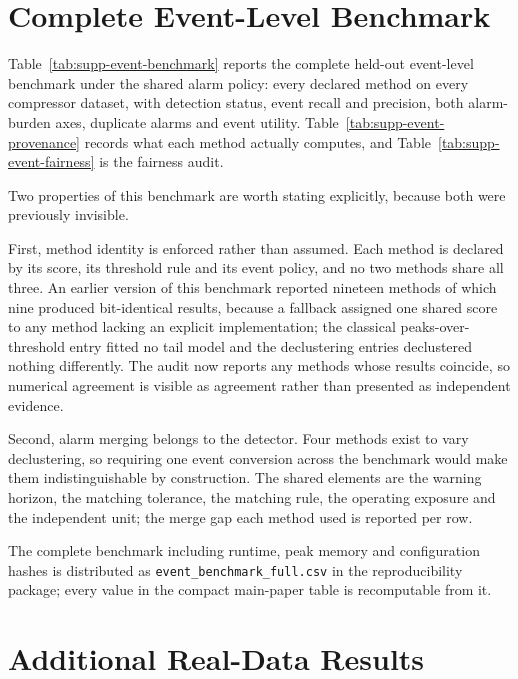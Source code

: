 \section{Complete Event-Level Benchmark}
\label{supp:event-benchmark}

Table~\ref{tab:supp-event-benchmark} reports the complete held-out event-level benchmark under the shared alarm policy: every declared method on every compressor dataset, with detection status, event recall and precision, both alarm-burden axes, duplicate alarms and event utility. Table~\ref{tab:supp-event-provenance} records what each method actually computes, and Table~\ref{tab:supp-event-fairness} is the fairness audit.

Two properties of this benchmark are worth stating explicitly, because both were previously invisible.

First, method identity is enforced rather than assumed. Each method is declared by its score, its threshold rule and its event policy, and no two methods share all three. An earlier version of this benchmark reported nineteen methods of which nine produced bit-identical results, because a fallback assigned one shared score to any method lacking an explicit implementation; the classical peaks-over-threshold entry fitted no tail model and the declustering entries declustered nothing differently. The audit now reports any methods whose results coincide, so numerical agreement is visible as agreement rather than presented as independent evidence.

Second, alarm merging belongs to the detector. Four methods exist to vary declustering, so requiring one event conversion across the benchmark would make them indistinguishable by construction. The shared elements are the warning horizon, the matching tolerance, the matching rule, the operating exposure and the independent unit; the merge gap each method used is reported per row.







The complete benchmark including runtime, peak memory and configuration hashes is distributed as \texttt{event\_benchmark\_full.csv} in the reproducibility package; every value in the compact main-paper table is recomputable from it.

\section{Additional Real-Data Results}
\label{supp:realdata}

